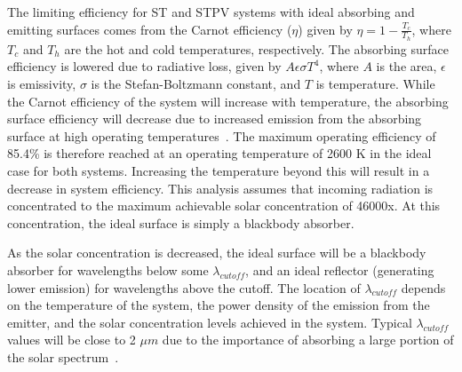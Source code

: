 \documentclass[review]{elsarticle}
\begin{document}
The limiting efficiency for ST and STPV systems with ideal absorbing and emitting surfaces comes from the Carnot efficiency ($\eta$) 
given by $\eta = 1 - \frac{T_c}{T_h}$, where $T_c$ and $T_h$ are the hot and cold temperatures, respectively. The absorbing 
surface efficiency is lowered due to radiative loss, 
given by $ A \epsilon \sigma T^4$, where $A$ is the area, $\epsilon$ is emissivity, $\sigma$ is the Stefan-Boltzmann constant, and $T$ is temperature.  
While the Carnot efficiency of the system will increase with temperature, the absorbing surface efficiency will decrease due to 
increased emission from the absorbing surface at high operating temperatures~\cite{L_AIP_2007}.  The maximum operating efficiency 
of 85.4\% is therefore reached at an operating temperature of 2600 K in the ideal case for both systems.  Increasing 
the temperature beyond this will result in a decrease in system efficiency.  This analysis assumes that incoming 
radiation is concentrated to the maximum achievable solar concentration of 46000x.  At this concentration, the 
ideal surface is simply a blackbody absorber.
 
As the solar concentration is decreased, the ideal surface will be a blackbody absorber for wavelengths below 
some $\lambda_{cutoff}$, and an ideal reflector (generating lower emission) for wavelengths above the cutoff.  The 
location of $\lambda_{cutoff}$
depends on the temperature of the system, the power density of the emission from the emitter, and the solar concentration 
levels achieved in the system.  Typical $\lambda_{cutoff}$ values will be close to 2 $\mu m$ due to the importance of absorbing a 
large portion of the solar spectrum~\cite{RF_OptExp_2009}.
 
\end{document}
